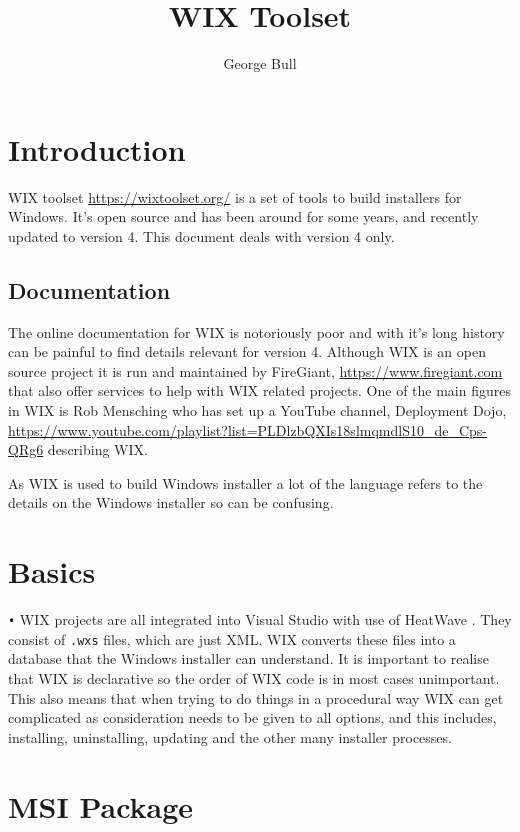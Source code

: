 \documentclass[12pt,a4paper]{report}
\author{George Bull}
\title{WIX Toolset}
\begin{document}
\maketitle
\chapter{Introduction}
WIX toolset \url{https://wixtoolset.org/} is a set of tools to build installers for Windows. It's open source and has been around for some years, and recently updated to version 4. This document deals with version 4 only.

\section{Documentation}
The online documentation for WIX is notoriously poor and with it's long history can be painful to find details relevant for version 4. Although WIX is an open source project it is run and maintained by FireGiant, \url{https://www.firegiant.com} that also offer services to help with WIX related projects. One of the main figures in WIX is Rob Mensching who has set up a YouTube channel, Deployment Dojo, \url{https://www.youtube.com/playlist?list=PLDlzbQXIs18slmqmdlS10_de_Cps-QRg6} describing WIX.

As WIX is used to build Windows installer a lot of the language refers to the details on the Windows installer so can be confusing.

\chapter{Basics}\texttt{•}
WIX projects are all integrated into Visual Studio with use of HeatWave \url{}. They consist of \texttt{.wxs} files, which are just XML. WIX converts these files into a database that the Windows installer can understand. It is important to realise that WIX is declarative so the order of WIX code is in most cases unimportant. This also means that when trying to do things in a procedural way WIX can get complicated as consideration needs to be given to all options, and this includes, installing, uninstalling, updating and the other many installer processes. 

\chapter{MSI Package}
\end{document}
